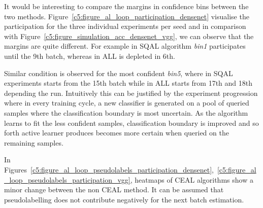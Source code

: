It would be interesting to compare the margins in confidence bins between the two methods. Figure~\ref{c5:figure_al_loop_participation_densenet} visualise the participation for the three individual experiments per seed and in comparison with Figure~\ref{c5:figure_simulation_acc_densenet_vgg}, we can observe that the margins are quite different. For example in SQAL algorithm \textit{bin1} participates until the 9th batch, whereas in ALL is depleted in 6th.

Similar condition is observed for the most confident \textit{bin5}, where in SQAL experiments starts from the 15th batch while in ALL starts from 17th and 18th depending the run.
Intuitively this can be justified by the experiment progression where in every training cycle, a new classifier is generated on a pool of queried samples where the classification boundary is most uncertain. 
As the algorithm learns to fit the less confident samples, classification boundary is improved and so forth active learner produces becomes more certain when queried on the remaining samples.

In Figures~\ref{c5:figure_al_loop_pseudolabels_participation_densenet},~\ref{c5:figure_al_loop_pseudolabels_participation_vgg}, heatmaps of CEAL algorithms show a minor change between the non CEAL method. It can be assumed that pseudolabelling does not contribute negatively for the next batch estimation.




